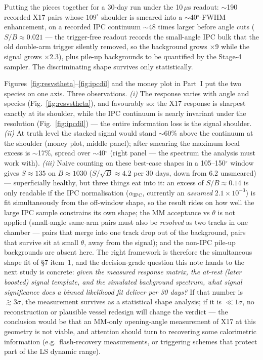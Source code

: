 \documentclass[11pt,a4paper]{article}
\begin{document}
Putting the pieces together for a 30-day run under the 10\,$\mu$s readout:
$\sim$190 recorded X17 pairs whose $109^{\circ}$ shoulder is smeared into a
$\sim$40$^{\circ}$-FWHM enhancement, on a recorded IPC continuum $\sim$48
times larger before angle cuts ($S/B \approx 0.021$ --- the trigger-free
readout records the small-angle IPC bulk that the old double-arm trigger
silently removed, so the background grows $\times$9 while the signal grows
$\times$2.3), plus pile-up backgrounds to be quantified by the Stage-4
sampler. The discriminating shape survives only statistically.

Figures~\ref{fig:resvstheta}--\ref{fig:ipcdil} and the money plot in Part~I
put the two species on one axis. Three observations. \emph{(i)} The
response varies with angle and species (Fig.~\ref{fig:resvstheta}), and
favourably so: the X17 response is sharpest exactly at its shoulder, while
the IPC continuum is nearly invariant under the resolution
(Fig.~\ref{fig:ipcdil}) --- the entire information loss is the signal
shoulder. \emph{(ii)} At truth level the stacked signal would stand
$\sim$60\% above the continuum at the shoulder (money plot, middle panel);
after smearing the maximum local excess is $\sim$17\%, spread over
$\sim$40$^{\circ}$ (right panel --- the spectrum the analysis must work
with). \emph{(iii)} Naive counting on these best-case shapes in a
105--150$^{\circ}$ window gives
$S \approx 135$ on $B \approx 1030$ ($S/\sqrt{B} \approx 4.2$ per 30 days,
down from 6.2 unsmeared) --- superficially healthy, but three things eat
into it: an excess of $S/B \approx 0.14$ is only readable if the IPC
normalisation ($\alpha_{\mathrm{IPC}}$, currently an \emph{assumed}
$2.1\times10^{-3}$) is fit simultaneously from the off-window shape, so the
result rides on how well the large IPC sample constrains its own shape; the
MM acceptance vs $\theta$ is not applied (small-angle same-arm pairs must
also be \emph{resolved} as two tracks in one chamber --- pairs that merge
into one track drop out of the background, pairs that survive sit at small
$\theta$, away from the signal); and the non-IPC pile-up backgrounds are
absent here.
The right framework is therefore the simultaneous shape fit of \S7 item~1,
and the decision-grade question this note hands to the next study is
concrete:
\emph{given the measured response matrix, the at-rest (later boosted) signal
template, and the simulated background spectrum, what signal significance
does a binned likelihood fit deliver per 30 days?} If that number is
$\gtrsim 3\sigma$, the measurement survives as a statistical shape analysis;
if it is $\ll 1\sigma$, no reconstruction or plausible vessel redesign will
change the verdict --- the conclusion would be that an MM-only opening-angle
measurement of X17 at this geometry is not viable, and attention should turn
to recovering some calorimetric information (e.g.\ flash-recovery
measurements, or triggering schemes that protect part of the LS dynamic
range).
\end{document}
